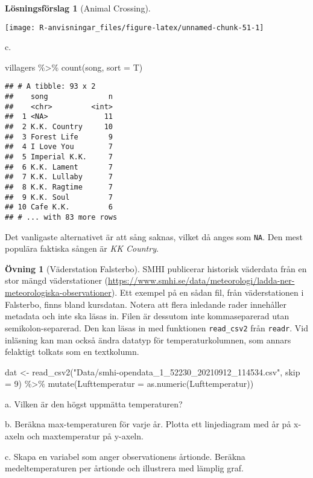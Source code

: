 \documentclass[
]{book}
\newenvironment{Shaded}{\begin{snugshade}}{\end{snugshade}}
\newcommand{\AttributeTok}[1]{\textcolor[rgb]{0.77,0.63,0.00}{#1}}
\newcommand{\DecValTok}[1]{\textcolor[rgb]{0.00,0.00,0.81}{#1}}
\newcommand{\FunctionTok}[1]{\textcolor[rgb]{0.00,0.00,0.00}{#1}}
\newcommand{\NormalTok}[1]{#1}
\newcommand{\OtherTok}[1]{\textcolor[rgb]{0.56,0.35,0.01}{#1}}
\newcommand{\SpecialCharTok}[1]{\textcolor[rgb]{0.00,0.00,0.00}{#1}}
\newcommand{\StringTok}[1]{\textcolor[rgb]{0.31,0.60,0.02}{#1}}
\theoremstyle{definition}
\theoremstyle{definition}
\theoremstyle{definition}
\newtheorem{exercise}{Övning}[chapter]
\theoremstyle{definition}
\newtheorem{hypothesis}{Lösningsförslag}[chapter]
\theoremstyle{remark}
\begin{document}
\begin{hypothesis}[Animal Crossing]
\begin{center}\texttt{[image: R-anvisningar\_files/figure-latex/unnamed-chunk-51-1]} \end{center}

c.

\begin{Shaded}
\begin{Highlighting}[]
\NormalTok{villagers }\SpecialCharTok{\%\textgreater{}\%} 
  \FunctionTok{count}\NormalTok{(song, }\AttributeTok{sort =}\NormalTok{ T)}
\end{Highlighting}
\end{Shaded}

\begin{verbatim}
## # A tibble: 93 x 2
##    song              n
##    <chr>         <int>
##  1 <NA>             11
##  2 K.K. Country     10
##  3 Forest Life       9
##  4 I Love You        7
##  5 Imperial K.K.     7
##  6 K.K. Lament       7
##  7 K.K. Lullaby      7
##  8 K.K. Ragtime      7
##  9 K.K. Soul         7
## 10 Cafe K.K.         6
## # ... with 83 more rows
\end{verbatim}

Det vanligaste alternativet är att sång saknas, vilket då anges som \texttt{NA}. Den mest populära faktiska sången är \emph{KK Country}.
\end{hypothesis}

\begin{exercise}[Väderstation Falsterbo]
SMHI publicerar historisk väderdata från en stor mängd väderstationer (\url{https://www.smhi.se/data/meteorologi/ladda-ner-meteorologiska-observationer}). Ett exempel på en sådan fil, från väderstationen i Falsterbo, finns bland kursdatan. Notera att flera inledande rader innehåller metadata och inte ska läsas in. Filen är dessutom inte kommaseparerad utan semikolon-separerad. Den kan läsas in med funktionen \texttt{read\_csv2} från \texttt{readr}. Vid inläsning kan man också ändra datatyp för temperaturkolumnen, som annars felaktigt tolkats som en textkolumn.

\begin{Shaded}
\begin{Highlighting}[]
\NormalTok{dat }\OtherTok{\textless{}{-}} \FunctionTok{read\_csv2}\NormalTok{(}\StringTok{"Data/smhi{-}opendata\_1\_52230\_20210912\_114534.csv"}\NormalTok{, }\AttributeTok{skip =} \DecValTok{9}\NormalTok{) }\SpecialCharTok{\%\textgreater{}\%} 
  \FunctionTok{mutate}\NormalTok{(}\AttributeTok{Lufttemperatur =} \FunctionTok{as.numeric}\NormalTok{(Lufttemperatur))}
\end{Highlighting}
\end{Shaded}

a. Vilken är den högst uppmätta temperaturen?

b. Beräkna max-temperaturen för varje år. Plotta ett linjediagram med år på x-axeln och maxtemperatur på y-axeln.

c. Skapa en variabel som anger observationens årtionde. Beräkna medeltemperaturen per årtionde och illustrera med lämplig graf.
\end{exercise}
\end{document}
